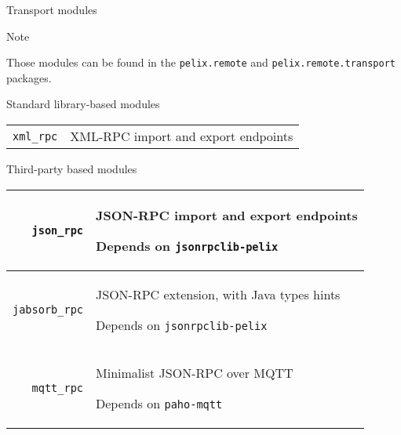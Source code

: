 \begin{frame}{Transport modules}
\begin{exampleblock}{Note}
\begin{small}
Those modules can be found in the \texttt{pelix.remote} and \texttt{pelix.remote.transport} packages.
\end{small}
\end{exampleblock}

\begin{block}{Standard library-based modules}
\begin{small}
\begin{tabular}{rp{}}
\texttt{xml\_rpc} & XML-RPC import and export endpoints \\
\end{tabular}
\end{small}
\end{block}

\begin{block}{Third-party based modules}
\begin{small}
\begin{tabular}{rp{}}
\texttt{json\_rpc} & JSON-RPC import and export endpoints \par Depends on \texttt{jsonrpclib-pelix} \\
\hline
\texttt{jabsorb\_rpc} & JSON-RPC extension, with Java types hints \par Depends on \texttt{jsonrpclib-pelix} \\
\hline
\texttt{mqtt\_rpc} & Minimalist JSON-RPC over MQTT \par Depends on \texttt{paho-mqtt} \\
\end{tabular}
\end{small}
\end{block}
\end{frame}
